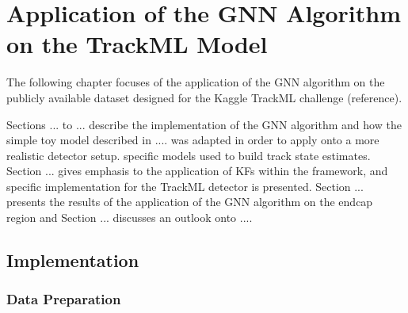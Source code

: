 


\chapter{Application of the GNN Algorithm on the TrackML Model}
\label{chapter-6}

The following chapter focuses of the application of the GNN algorithm on the publicly available dataset designed for the Kaggle TrackML challenge (reference).

Sections ... to ... describe the implementation of the GNN algorithm and how the simple toy model described in .... was adapted in order to apply onto a more realistic detector setup. specific models used to build track state estimates. Section ... gives emphasis to the application of KFs within the framework, and specific implementation for the TrackML detector is presented. Section ... presents the results of the application of the GNN algorithm on the endcap region and Section ... discusses an outlook onto ....




\section{Implementation}


\subsection{Data Preparation}

